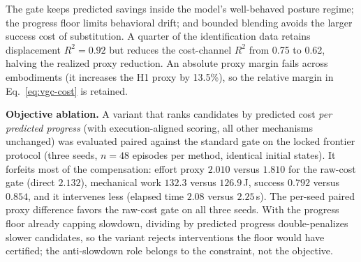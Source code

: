 The gate keeps predicted savings inside the model's well-behaved posture regime;
the progress floor limits behavioral drift; and bounded blending avoids the larger
success cost of substitution. A quarter of the identification data retains
displacement $R^2=0.92$ but reduces the cost-channel $R^2$ from 0.75 to 0.62,
halving the realized proxy reduction. An absolute proxy margin fails across
embodiments (it increases the H1 proxy by 13.5\%), so the relative margin in
Eq.~\ref{eq:vgc-cost} is retained.

\textbf{Objective ablation.}
A variant that ranks candidates by predicted cost \emph{per predicted progress}
(with execution-aligned scoring, all other mechanisms unchanged) was evaluated
paired against the standard gate on the locked frontier protocol (three seeds,
$n=48$ episodes per method, identical initial states). It forfeits most of the
compensation: effort proxy $2.010$ versus $1.810$ for the raw-cost gate (direct
$2.132$), mechanical work $132.3$ versus $126.9$\,J, success $0.792$ versus
$0.854$, and it intervenes less (elapsed time $2.08$ versus $2.25$\,s). The
per-seed paired proxy difference favors the raw-cost gate on all three seeds.
With the progress floor already capping slowdown, dividing by predicted progress
double-penalizes slower candidates, so the variant rejects interventions the
floor would have certified; the anti-slowdown role belongs to the constraint,
not the objective.
